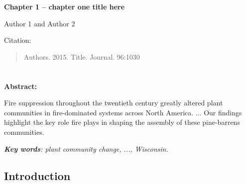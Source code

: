 \clearpage
{}
{}

\begin{center}
\textbf{\Large{}Chapter 1 -- chapter one title here}
\label{chap:chapter1}
\par
\end{center}
{\Large \par}

\bigskip{}


\begin{center}
Author 1 and Author 2 %
\par\end{center}

\bigskip{}




Citation:
\begin{quote}
Authors. 2015. Title. Journal. 96:1030
\end{quote}
\vfill
\chapter*{}
\setcounter{chapter}{1}

\textbf{Abstract:}

Fire suppression throughout the twentieth century greatly altered
plant communities in fire-dominated systems across North America.
... Our findings highlight the key role fire plays in shaping
the assembly of these pine-barrens communities.

\textbf{\emph{Key words}}\emph{: plant community change, ..., Wisconsin.}

\clearpage{}


\section*{Introduction}

